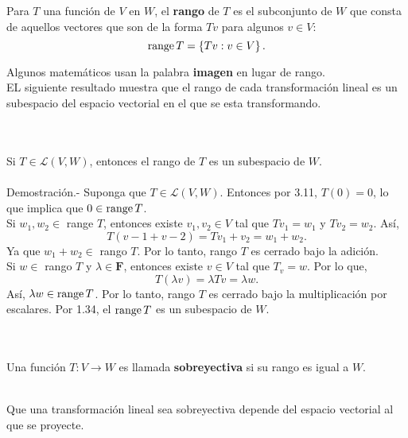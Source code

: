 \begin{mydef}[Rango]\,\\\\
    Para $T$ una función de $V$ en $W$, el \textbf{rango} de $T$ es el subconjunto de $W$ que consta de aquellos vectores que son de la forma $Tv$ para algunos $v\in V$:
$$\operatorname{range} T=\left\{Tv:v\in V\right\}.$$
\end{mydef}

Algunos matemáticos usan la palabra \textbf{imagen} en lugar de rango.\\

EL siguiente resultado muestra que el rango de cada transformación lineal es un subespacio del espacio vectorial en el que se esta transformando.

\setcounter{myteo}{18}
\begin{myteo}\,\\\\
    Si $T\in \mathcal{L}(V,W)$, entonces el rango de $T$ es un subespacio de $W$.\\\\
	Demostración.-\; Suponga que $T\in \mathcal{L}(V,W)$. Entonces por 3.11, $T(0)=0$, lo que implica que $0\in \operatorname{range} T$.\\
	Si $w_1,w_2\in$ range $T$, entonces existe $v_1,v_2\in V$ tal que $Tv_1=w_1$ y $Tv_2=w_2$. Así,
	$$T(v-1+v-2)=Tv_1+v_2=w_1+w_2.$$
	Ya que $w_1+w_2\in$ rango $T$. Por lo tanto, rango $T$ es cerrado bajo la adición.\\
	Si $w\in$ rango $T$ y $\lambda\in \textbf{F}$, entonces existe $v\in V$ tal que $T_v=w$.
	Por lo que, 
	$$T(\lambda v)=\lambda Tv=\lambda w.$$
	Así, $\lambda w\in \operatorname{range} T$. Por lo tanto, rango $T$ es cerrado bajo la multiplicación por escalares. Por 1.34, el  $\operatorname{range} T$ es un subespacio de $W$.
\end{myteo}

\begin{mydef}[Sobreyectiva]\,\\\\
	Una función $T:V\to W$ es llamada \textbf{sobreyectiva} si su rango es igual a $W$.\\\\
\end{mydef}

Que una transformación lineal sea sobreyectiva depende del espacio vectorial al que se proyecte.\\

